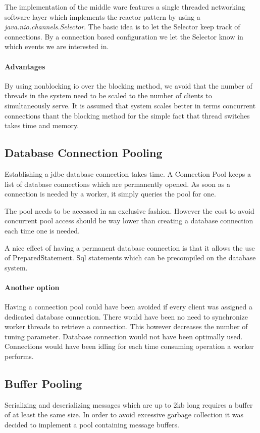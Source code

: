 \documentclass[a4paper]{article}
\begin{document}
The implementation of the middle ware features a single threaded networking software layer which implements the reactor pattern by using a \textit{java.nio.channels.Selector}. The basic idea is to let the Selector keep track of connections. By a connection based configuration we let the Selector know in which events we are interested in.

\paragraph{Advantages}
By using nonblocking io over the blocking method, we avoid that the number of threads in the system need to be scaled to the number of clients to simultaneously serve. It is assumed that system scales better in terms concurrent connections thant the blocking method for the simple fact that thread switches takes time and memory.

\subsection{Database Connection Pooling}
Establishing a jdbc database connection takes time. A Connection Pool keeps a list of database connections which are permanently opened. As soon as a connection is needed by a worker, it simply queries the pool for one.

The pool needs to be accessed in an exclusive fashion. However the cost to avoid concurrent pool access should be way lower than creating a database connection each time one is needed.

A nice effect of having a permanent database connection is that it allows the use of PreparedStatement. Sql statements which can be precompiled on the database system.

\paragraph{Another option}
Having a connection pool could have been avoided if every client was assigned a dedicated database connection. There would have been no need to synchronize worker threads to retrieve a connection. This however decreases the number of tuning parameter. Database connection would not have been optimally used. Connections would have been idling for each time consuming operation a worker performs.

\subsection{Buffer Pooling}
\label{sub:buffer-pooling}
Serializing and deserializing messages which are up to 2kb long requires a buffer of at least the same size. In order to avoid excessive garbage collection it was decided to implement a pool containing message buffers.
\end{document}
